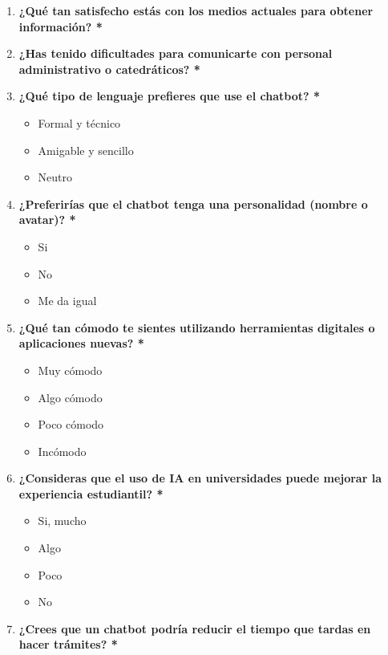 {{\begin{enumerate}[label=\textbf{\arabic*.}]
            \item \textbf{¿Qué tan satisfecho estás con los medios actuales para obtener información? *}

            \item \textbf{¿Has tenido dificultades para comunicarte con personal administrativo o catedráticos? *}

            \item \textbf{¿Qué tipo de lenguaje prefieres que use el chatbot? *}
            \begin{itemize}[label=$\square$]
                \item Formal y técnico
                \item Amigable y sencillo
                \item Neutro
            \end{itemize}

            \item \textbf{¿Preferirías que el chatbot tenga una personalidad (nombre o avatar)? *}
            \begin{itemize}[label=$\square$]
                \item Si
                \item No
                \item Me da igual
            \end{itemize}

            \item \textbf{¿Qué tan cómodo te sientes utilizando herramientas digitales o aplicaciones nuevas? *}
            \begin{itemize}[label=$\square$]
                \item Muy cómodo
                \item Algo cómodo
                \item Poco cómodo
                \item Incómodo
            \end{itemize}

            \item \textbf{¿Consideras que el uso de IA en universidades puede mejorar la experiencia estudiantil? *}
            \begin{itemize}[label=$\square$]
                \item Si, mucho
                \item Algo
                \item Poco
                \item No
            \end{itemize}

            \item \textbf{¿Crees que un chatbot podría reducir el tiempo que tardas en hacer trámites? *}

        \end{enumerate}
    }
    
    }
